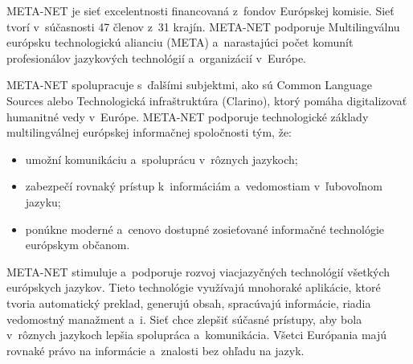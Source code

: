 \noindent META-NET je sieť excelentnosti financovaná z~fondov Európskej komisie. Sieť tvorí v~súčasnosti 47 členov z~31 krajín. META-NET podporuje Multilingválnu európsku technologickú alianciu (META) a~narastajúci počet komunít profesionálov jazykových technológií a~organizácií v~Európe.


META-NET spolupracuje s~ďalšími subjektmi, ako sú Common Language Sources alebo Technologická infraštruktúra (Clarino), ktorý pomáha digitalizovať humanitné vedy v~Európe. META-NET podporuje technologické základy multilingválnej európskej informačnej spoločnosti tým, že:

\begin{itemize}
\item umožní komunikáciu a~spoluprácu v~rôznych jazykoch;
\item zabezpečí rovnaký prístup k~informáciám a~vedomostiam v~ľubovoľnom jazyku;
\item ponúkne moderné a~cenovo dostupné zosieťované informačné technológie európskym občanom. 
\end{itemize}

META-NET stimuluje a~podporuje rozvoj viacjazyčných technológií všetkých európskych jazykov. Tieto technológie využívajú mnohoraké aplikácie, ktoré tvoria automatický preklad, generujú obsah, spracúvajú informácie, riadia vedomostný manažment a~i. Sieť chce zlepšiť súčasné prístupy, aby bola v~rôznych jazykoch lepšia spolupráca a~komunikácia. Všetci Európania majú rovnaké právo na informácie a~znalosti bez ohľadu na jazyk.
